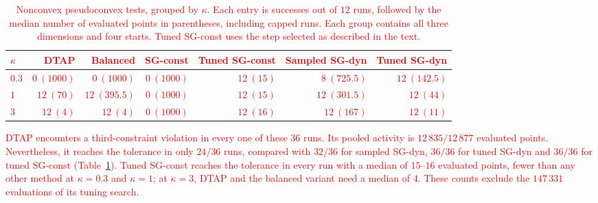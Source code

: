 \documentclass[]{interact}
\theoremstyle{plain}
\theoremstyle{definition}
\theoremstyle{remark}
\begin{document}
\begin{table}[t]
\centering\small
\setlength{\tabcolsep}{5pt}
\caption{\textcolor{red}{Nonconvex pseudoconvex tests, grouped by $\kappa$.
Each entry is successes out of $12$ runs, followed by the median number
of evaluated points in parentheses, including capped runs. Each group
contains all three dimensions and four starts. Tuned SG-const uses the step
selected as described in the text.}}
\label{tab:synthetic-scale}
\begin{tabular}{@{}lrrrrrr@{}}
\toprule
\leavevmode\textcolor{red}{$\kappa$} & \leavevmode\textcolor{red}{DTAP} & \leavevmode\textcolor{red}{Balanced} & \leavevmode\textcolor{red}{SG-const} & \leavevmode\textcolor{red}{Tuned SG-const} & \leavevmode\textcolor{red}{Sampled SG-dyn} & \leavevmode\textcolor{red}{Tuned SG-dyn}\\
\midrule
\leavevmode\textcolor{red}{$0.3$} & \leavevmode\textcolor{red}{$0\ (1000)$} & \leavevmode\textcolor{red}{$0\ (1000)$} & \leavevmode\textcolor{red}{$0\ (1000)$} & \leavevmode\textcolor{red}{$12\ (15)$} & \leavevmode\textcolor{red}{$8\ (725.5)$} & \leavevmode\textcolor{red}{$12\ (142.5)$}\\
\leavevmode\textcolor{red}{$1$}   & \leavevmode\textcolor{red}{$12\ (70)$} & \leavevmode\textcolor{red}{$12\ (395.5)$} & \leavevmode\textcolor{red}{$0\ (1000)$} & \leavevmode\textcolor{red}{$12\ (15)$} & \leavevmode\textcolor{red}{$12\ (301.5)$} & \leavevmode\textcolor{red}{$12\ (44)$}\\
\leavevmode\textcolor{red}{$3$}   & \leavevmode\textcolor{red}{$12\ (4)$} & \leavevmode\textcolor{red}{$12\ (4)$} & \leavevmode\textcolor{red}{$0\ (1000)$} & \leavevmode\textcolor{red}{$12\ (16)$} & \leavevmode\textcolor{red}{$12\ (167)$} & \leavevmode\textcolor{red}{$12\ (11)$}\\
\bottomrule
\end{tabular}
\end{table}

\leavevmode\textcolor{red}{DTAP encounters a third-constraint violation in every one of these $36$
runs. Its pooled activity is $12\,835/12\,877$ evaluated points.
Nevertheless, it reaches the tolerance in only $24/36$ runs, compared
with $32/36$ for sampled SG-dyn, $36/36$ for tuned SG-dyn and $36/36$ for tuned
SG-const (Table~\ref{tab:synthetic-scale}).
Tuned SG-const reaches the tolerance in every run with a median of $15$--$16$
evaluated points, fewer than any other method at $\kappa=0.3$ and $\kappa=1$; at
$\kappa=3$, DTAP and the balanced variant need a median of $4$. These counts
exclude the $147\,331$ evaluations of its tuning search.}
\end{document}
